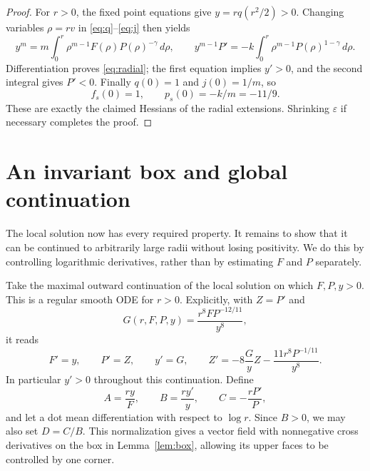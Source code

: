 \documentclass[11pt]{article}
\theoremstyle{remark}
\begin{document}
\begin{proof}
For $r>0$, the fixed point equations give $y=rq(r^2/2)>0$.
Changing variables $\rho=rv$ in \eqref{eq:q}--\eqref{eq:j}
then yields
\begin{equation}\label{eq:integral}
 y^m=m\int_0^r \rho^{m-1}F(\rho)P(\rho)^{-\gamma}\,d\rho,
 \qquad
 y^{m-1}P'=-k\int_0^r\rho^{m-1}P(\rho)^{1-\gamma}\,d\rho.
\end{equation}
Differentiation proves \eqref{eq:radial}; the first equation
implies $y'>0$, and the second integral gives $P'<0$.
Finally $q(0)=1$ and $j(0)=1/m$, so
\[
 f_s(0)=1,\qquad p_s(0)=-k/m=-11/9.
\]
These are exactly the claimed Hessians of the radial extensions.
Shrinking $\varepsilon$ if necessary completes the proof.
\end{proof}

\section{An invariant box and global continuation}\label{sec:global}
The local solution now has every required property.  It remains
to show that it can be continued to arbitrarily large radii without
losing positivity.  We do this by controlling logarithmic derivatives,
rather than by estimating $F$ and $P$ separately.

Take the maximal outward continuation of the local solution on
which $F,P,y>0$.  This is a regular smooth ODE for $r>0$.
Explicitly, with $Z=P'$ and
\[
 G(r,F,P,y)=\frac{r^8FP^{-12/11}}{y^8},
\]
it reads
\begin{equation}\label{eq:regular}
 F'=y,\qquad P'=Z,\qquad y'=G,\qquad
 Z'=-8\frac Gy Z-\frac{11r^8P^{-1/11}}{y^8}.
\end{equation}
In particular $y'>0$ throughout this continuation.
Define
\begin{equation}\label{eq:ratios}
 A=\frac{ry}{F},\qquad B=\frac{ry'}y,
 \qquad C=-\frac{rP'}P,
\end{equation}
and let a dot mean differentiation with respect to $\log r$.
Since $B>0$, we may also set $D=C/B$.
This normalization gives a vector field with nonnegative cross
derivatives on the box in Lemma~\ref{lem:box}, allowing its upper
faces to be controlled by one corner.
\end{document}
